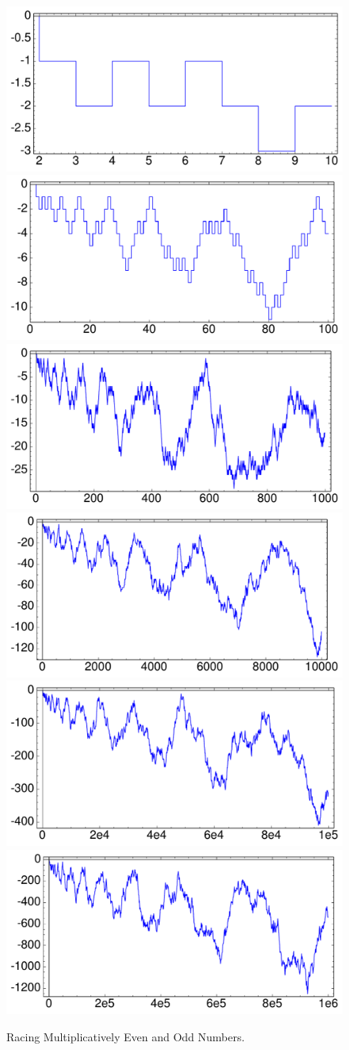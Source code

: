 \documentclass[11pt]{article}
\theoremstyle{plain}
\theoremstyle{definition}
\numberwithin{equation}{section}
\numberwithin{figure}{section}
\numberwithin{table}{section}
\begin{document}
 \begin{figure}[H]
\begin{center}
\includegraphics[width=.4\textwidth]{illustrations/liouville-10}
\includegraphics[width=.4\textwidth]{illustrations/liouville-100}\\
\includegraphics[width=.4\textwidth]{illustrations/liouville-1000}
\includegraphics[width=.4\textwidth]{illustrations/liouville-10000}\\
\includegraphics[width=.4\textwidth]{illustrations/liouville-100000}
\includegraphics[width=.4\textwidth]{illustrations/liouville-1000000}\\
\caption{Racing Multiplicatively Even and Odd Numbers.\label{fig:liouville}}
\end{center}
\end{figure}
  
\end{document}
